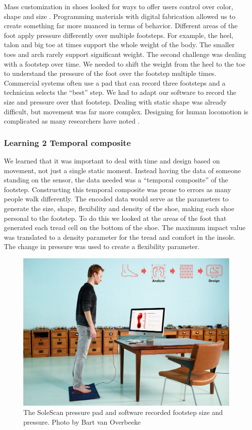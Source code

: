 Mass customization in shoes looked for ways to offer users control over color, shape and size \cite{Piller2012}. Programming materials with digital fabrication allowed us to create something far more nuanced in terms of behavior. Different areas of the foot apply pressure differently over multiple footsteps. For example, the heel, talon and big toe at times support the whole weight of the body. The smaller toes and arch rarely support significant weight. The second challenge was dealing with a footstep over time. We needed to shift the weight from the heel to the toe to understand the pressure of the foot over the footstep multiple times. Commercial systems often use a pad that can record three footsteps and a technician selects the ``best'' step. We had to adapt our software to record the size and pressure over that footstep. Dealing with static shape was already difficult, but movement was far more complex. Designing for human locomotion is complicated as many researchers have noted \cite{Lindqvist2014}\cite{Lindqvist2015}\cite{Bickel2010}.  

\subsubsection{Learning 2 Temporal composite}

We learned that it was important to deal with time and design based on movement, not just a single static moment. Instead having the data of someone standing on the sensor, the data needed was a ``temporal composite'' \cite{Koegel1992} of the footstep. Constructing this temporal composite was prone to errors as many people walk differently. The encoded data would serve as the parameters to generate the size, shape, flexibility and density of the shoe, making each shoe personal to the footstep. To do this we looked at the areas of the foot that generated each tread cell on the bottom of the shoe. The maximum impact value was translated to a density parameter for the tread and comfort in the insole. The change in pressure was used to create a flexibility parameter. 

\begin{figure}
\includegraphics[width=.5\textwidth]{SoleScan}
\caption{The SoleScan pressure pad and software recorded footstep size and pressure. Photo by Bart van Overbeeke}
\label{fig:Project1}
\end{figure}

